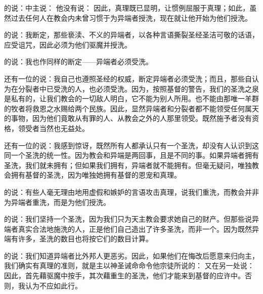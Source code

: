 的说：中主说：  他没有说： 因此，真理既已显明，让惯例屈服于真理；如此，虽然过去任何人在教会内未曾习惯于为异端者授洗，现在就让他开始为他们授洗。\par

的说：我断定，那些亵渎、不义的异端者，以各种言语撕裂圣经圣洁可敬的话语，应受诅咒，因此必须为他们驱魔并授洗。\par

的说：我也作同样的断定——异端者必须受洗。\par

还有一位的说：我自己也遵照圣经的权威，断定异端者必须受洗；而且，那些自认为在分裂者中已受洗的人，也必须受洗。因为，按照基督的警告，我们的圣洗之泉是私有的，让我们教会的一切敌人明白，它不能为别人所用。也不能由那唯一羊群的牧者将救恩之水赐给两个民族。因此，显然异端者和分裂者都不能领受任何属天的事物，因为他们竟敢从有罪的人、从教会之外的人那里领受。既然施予者没有资格，领受者当然也无益处。\par

还有一位的说：我感到惊讶，既然所有人都承认只有一个圣洗，却没有人认识到这同一个圣洗的统一性。因为教会和异端是两回事，且是不同的事。如果异端者拥有圣洗，我们就未拥有；但如果我们拥有，异端者就不能拥有。但毫无疑问，唯独教会拥有基督的圣洗，因为唯独她拥有基督的恩宠和真理。\par

的说：有些人毫无理由地用虚假和嫉妒的言语攻击真理，说我们重洗，而教会并非为异端者重洗，而是为他们授洗。\par

的说：我们坚持一个圣洗，因为我们只为天主教会要求她自己的财产。但那些说异端者真实合法地施洗的人，正是他们自己造出了许多圣洗，而非一个。因为既然异端有许多，圣洗的数目也将按它们的数目计算。\par

的说：我们知道异端者比外邦人更恶劣。因此，如果他们在悔改后愿意来归向主，我们确实有真理的准则，就是主以神圣诫命命令他宗徒所说的： 又在另一处说：  因此，首先藉驱魔中按手，其次藉重生的圣洗，他们才能来到基督的应许中。否则，我认为不应如此行。\par

